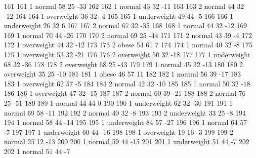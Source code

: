 \begin{Schunk}
\begin{Soutput}
		161         161   1      normal  58         25          -33
		162         162   1      normal  43         32          -11
		163         163   2      normal  44         32          -12
		164         164   1  overweight  36         32           -4
		165         165   1 underweight  49         44           -5
		166         166   1 underweight  26         32            6
		167         167   2      normal  67         32          -35
		168         168   1      normal  44         32          -12
		169         169   1      normal  70         44          -26
		170         170   2      normal  69         25          -44
		171         171   2      normal  43         39           -4
		172         172   1  overweight  44         32          -12
		173         173   2       obese  54         61            7
		174         174   1      normal  40         32           -8
		175         175   1  overweight  53         32          -21
		176         176   2  overweight  50         32          -18
		177         177   1 underweight  68         32          -36
		178         178   2  overweight  68         25          -43
		179         179   1      normal  45         32          -13
		180         180   2  overweight  35         25          -10
		181         181   1       obese  46         57           11
		182         182   1      normal  56         39          -17
		183         183   1  overweight  62         57           -5
		184         184   2      normal  42         32          -10
		185         185   1      normal  50         32          -18
		186         186   1  overweight  47         32          -15
		187         187   2      normal  60         39          -21
		188         188   2      normal  76         25          -51
		189         189   1      normal  44         44            0
		190         190   1 underweight  62         32          -30
		191         191   1      normal  69         58          -11
		192         192   2      normal  40         32           -8
		193         193   2 underweight  33         25           -8
		194         194   1      normal  58         44          -14
		195         195   1 underweight  84         57          -27
		196         196   1      normal  64         57           -7
		197         197   1 underweight  60         44          -16
		198         198   1  overweight  19         16           -3
		199         199   2      normal  25         12          -13
		200         200   1      normal  59         44          -15
		201         201   1 underweight  51         44           -7
		202         202   1      normal  51         44           -7

\end{Soutput}
\end{Schunk}
